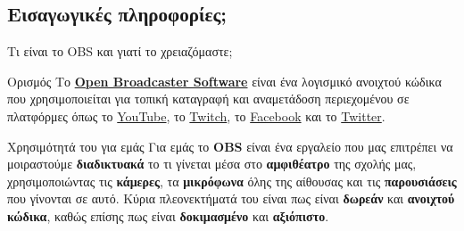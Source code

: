 \documentclass[aspectratio=169]{beamer}
\begin{document}
\subsection{Εισαγωγικές πληροφορίες;}
\begin{frame}{Τι είναι το OBS και γιατί το χρειαζόμαστε;}
  \begin{block}{Ορισμός}
    Το \textbf{\href{https://obsproject.com/}{Open Broadcaster Software}} είναι ένα λογισμικό ανοιχτού κώδικα που χρησιμοποιείται
    για τοπική καταγραφή και αναμετάδοση περιεχομένου σε πλατφόρμες όπως το \href{https://www.youtube.com/}{YouTube},
    το \href{https://www.twitch.tv/}{Twitch}, το \href{https://www.facebook.com/}{Facebook} και το \href{https://twitter.com/}{Twitter}.
  \end{block}
  \begin{block}{Χρησιμότητά του για εμάς}
    Για εμάς το \textbf{OBS} είναι ένα εργαλείο που μας επιτρέπει να μοιραστούμε \textbf{διαδικτυακά} το τι γίνεται μέσα στο \textbf{αμφιθέατρο}
    της σχολής μας, χρησιμοποιώντας τις \textbf{κάμερες}, τα \textbf{μικρόφωνα} όλης της αίθουσας και τις \textbf{παρουσιάσεις} που γίνονται σε αυτό.
    Κύρια πλεονεκτήματά του είναι πως είναι \textbf{δωρεάν} και \textbf{ανοιχτού κώδικα}, καθώς επίσης πως είναι \textbf{δοκιμασμένο} και \textbf{αξιόπιστο}.
  \end{block}
\end{frame}
\end{document}
